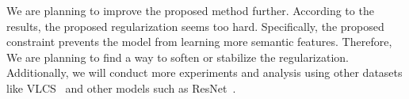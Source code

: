 We are planning to improve the proposed method further. According to the results, the proposed regularization seems too hard. Specifically, the proposed constraint prevents the model from learning more semantic features. Therefore, We are planning to find a way to soften or stabilize the regularization. Additionally, we will conduct more experiments and analysis using other datasets like VLCS~\cite{chen2013vlcs} and other models such as ResNet~\cite{He2016resnet}.